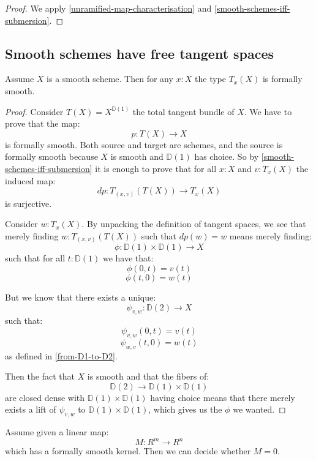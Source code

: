 \begin{proof}
We apply \cref{unramified-map-characterisation} and \cref{smooth-schemes-iff-submersion}.
\end{proof}



\subsection{Smooth schemes have free tangent spaces}


\begin{lemma}\label{smooth-implies-smooth-tangent}
Assume $X$ is a smooth scheme. Then for any $x:X$ the type $T_x(X)$ is formally smooth.
\end{lemma}

\begin{proof}
Consider $T(X) = X^{\mathbb{D}(1)}$ the total tangent bundle of $X$. We have to prove that the map:
\[p:T(X)\to X\]
is formally smooth. Both source and target are schemes, and the source is formally smooth because $X$ is smooth and $\mathbb{D}(1)$ has choice. So by \cref{smooth-schemes-iff-submersion} it is enough to prove that for all $x:X$ and $v:T_x(X)$ the induced map:
\[dp:T_{(x,v)}(T(X))\to T_x(X)\]
is surjective. 

Consider $w:T_x(X)$. By unpacking the definition of tangent spaces, we see that merely finding $w:T_{(x,v)}(T(X))$ such that $dp(w) = w$ means merely finding:
\[\phi : \mathbb{D}(1) \times \mathbb{D}(1) \to X\]
such that for all $t:\mathbb{D}(1)$ we have that:
\[\phi(0,t) = v(t)\]
\[\phi(t,0) = w(t)\]

But we know that there exists a unique:
\[\psi_{v,w} : \mathbb{D}(2)\to X\]
such that:
\[\psi_{v,w}(0,t) = v(t)\]
\[\psi_{w,v}(t,0) = w(t)\]
as defined in \cref{from-D1-to-D2}.

Then the fact that $X$ is smooth and that the fibers of:
\[\mathbb{D}(2) \to\mathbb{D}(1) \times \mathbb{D}(1) \]
are closed dense with $\mathbb{D}(1) \times \mathbb{D}(1)$ having choice means that there merely exists a lift of $\psi_{v,w}$ to $\mathbb{D}(1) \times \mathbb{D}(1)$, which gives us the $\phi$ we wanted.
\end{proof}

\begin{lemma}\label{smooth-kernel-decidable}
Assume given a linear map:
\[M:R^m\to R^n\] 
which has a formally smooth kernel. Then we can decide whether $M=0$.
\end{lemma}

